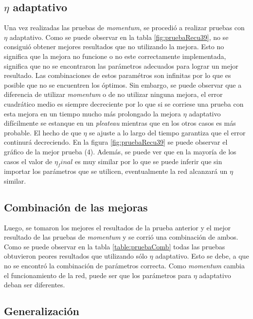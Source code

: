 \documentclass[11pt,a4paper]{article}
\begin{document}
   
\subsection{\texorpdfstring{$\eta$ adaptativo}{Tasa de aprendizaje adaptativa}}

Una vez realizadas las pruebas de \emph{momentum}, se procedió a realizar pruebas con $\eta$ adaptativo. Como se puede observar en la tabla \ref{fig:pruebaRecu39}, no se consiguió obtener mejores resultados que no utilizando la mejora. Esto no significa que la mejora no funcione o no este correctamente implementada, significa que no se encontraron las parámetros adecuados para lograr un mejor resultado. Las combinaciones de estos paramétros son infinitas por lo que es posible que no se encuentren los óptimos. Sin embargo, se puede observar que a diferencia de utilizar \emph{momentum} o de no utilizar ninguna mejora, el error cuadrático medio es siempre decreciente por lo que si se corriese una prueba con esta mejora en un tiempo mucho más prolongado la mejora $\eta$ adaptativo difícilmente se estanque en un \emph{pleateau} mientras que en los otros casos es más probable. El hecho de que $\eta$ se ajuste a lo largo del tiempo garantiza que el error continurá decreciendo. En la figura \ref{fig:pruebaRecu39} se puede observar el gráfico de la mejor prueba (4). Además, se puede ver que en la mayoría de los casos el valor de $\eta_final$ es muy similar por lo que se puede inferir que sin importar los parámetros que se utilicen, eventualmente la red alcanzará un $\eta$ similar.

\subsection{Combinación de las mejoras}

Luego, se tomaron los mejores el resultados de la prueba anterior y el mejor resultado de las pruebas de \emph{momentum} y se corrió una combinación de ambos. Como se puede observar en la tabla \ref{table:pruebaComb} todas las pruebas obtuvieron peores resultados que utilizando sólo $\eta$ adaptativo. Esto se debe, a que no se encontró la combinación de parámetros correcta.  Como \emph{momentum} cambia el funcionamiento de la red, puede ser que los parámetros para $\eta$ adaptativo deban ser diferentes.

\subsection{Generalización}
\end{document}
